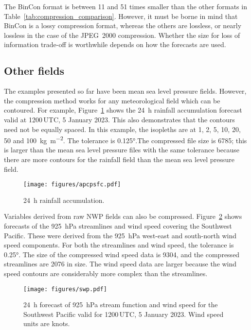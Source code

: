 \documentclass[12pt,a4paper]{article}
\begin{document}
The BinCon format is between 11 and 51 times smaller than the other formats in
Table~\ref{tab:compression_comparison}. However, it must be borne in mind that
BinCon is a lossy compression format, whereas the others are lossless, or
nearly lossless in the case of the JPEG~2000 compression. Whether the size for
loss of information trade-off is worthwhile depends on how the forecasts are
used.

\subsection*{Other fields}
\label{sec:other_fields}

The examples presented so far have been mean sea level pressure fields.
However, the compression method works for any meteorological field which can be
contoured. For example, Figure~\ref{fig:rain} shows the \SI{24}{\hour} rainfall
accumulation forecast valid at 1200\,UTC, 5 January 2023. This also demonstrates
that the contours need not be equally spaced. In this example, the isopleths are
at 1, 2, 5, 10, 20, 50 and \SI{100}{\kg\per\m\squared}. The tolerance is
\ang{0.125}.The compressed file size is \SI{6785}{\byte}; this is larger than
the mean sea level pressure files with the same tolerance because there are
more contours for the rainfall field than the mean sea level pressure field.

\begin{figure}
\centering
\texttt{[image: figures/apcpsfc.pdf]}
\caption{\label{fig:rain}\SI{24}{\hour} rainfall accumulation.}
\end{figure}

Variables derived from raw NWP fields can also be compressed.
Figure~\ref{fig:swp} shows forecasts of the \SI{925}{\hecto\Pa} streamlines and
wind speed covering the Southwest Pacific. These were derived from the
\SI{925}{\hecto\Pa} west-east and south-north wind speed components. For both
the streamlines and wind speed, the tolerance is \ang{0.25}. The size of the
compressed wind speed data is \SI{9304}{\byte}, and the compressed streamlines
are \SI{2076}{\byte} in size. The wind speed data are larger because the wind
speed contours are considerably more complex than the streamlines.

\begin{figure}
\centering
\texttt{[image: figures/swp.pdf]}
\caption{\label{fig:swp}\SI{24}{\hour} forecast of \SI{925}{\hecto\Pa}
stream function and wind speed for the Southwest Pacific valid
for 1200\,UTC, 5 January 2023. Wind speed units are knots.}
\end{figure}
\end{document}
